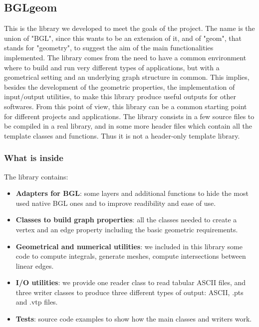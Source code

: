 \documentclass[10pt]{article} %
\begin{document}
	\subsection{BGLgeom}
	This is the library we developed to meet the goals of the project. The name is the union of "BGL", since this wants to be an extension of it, and of "geom", that stands for "geometry", to suggest the aim of the main functionalities implemented. 
	\newline\newline
	The library comes from the need to have a common environment where to build and run very different types of applications, but with a geometrical setting and an underlying graph structure in common. This implies, besides the development of the geometric properties, the implementation of input/output utilities, to make this library produce useful outputs for other softwares. From this point of view, this library can be a common starting point for different projects and applications.
	\newline\newline
	The library consists in a few source files to be compiled in a real library, and in some more header files which contain all the template classes and functions. Thus it is not a header-only template library.
	
	\subsubsection{What is inside}
	The library contains:
	\begin{itemize}
		\item \textbf{Adapters for BGL}: some layers and additional functions to hide the most used native BGL ones and to improve readibility and ease of use.
		\item \textbf{Classes to build graph properties}: all the classes needed to create a vertex and an edge property including the basic geometric requirements.
		\item \textbf{Geometrical and numerical utilities}: we included in this library some code to compute integrals, generate meshes, compute intersections between linear edges.
		\item \textbf{I/O utilities}: we provide one reader class to read tabular ASCII files, and three writer classes to produce three different types of output: ASCII, .pts and .vtp files.
		\item \textbf{Tests}: source code examples to show how the main classes and writers work.
	\end{itemize}
	
\end{document}
